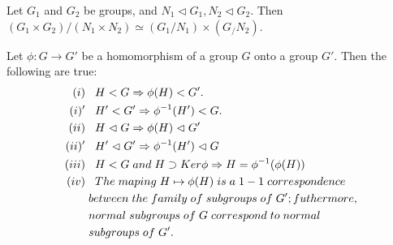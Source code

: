 \begin{teo}
    Let $G_1$ and $G_2$ be groups, and $N_1\vartriangleleft G_1, N_2\vartriangleleft G_2$. Then $(G_1\times G_2)/(N_1\times N_2)\simeq (G_1/N_1)\times(G_/N_2)$.
\end{teo}
\begin{teo}
    Let $\phi:G\rightarrow G'$ be a homomorphism of a group $G$ onto a group $G'$. Then the following are true:
    \begin{align*}
    (i)&\hspace{.3cm}H<G\Rightarrow \phi(H)<G'.\\
    (i)'&\hspace{.3cm}H'<G'\Rightarrow \phi^{-1}(H')<G.\\
    (ii)&\hspace{.3cm}H\vartriangleleft G\Rightarrow \phi(H)\vartriangleleft G'\\
    (ii)'&\hspace{.3cm}H'\vartriangleleft G'\Rightarrow \phi^{-1}(H')\vartriangleleft G\\
    (iii)&\hspace{.3cm}H<G\hspace{.1cm}and\hspace{.1cm}H\supset Ker\phi \Rightarrow H=\phi^{-1}(\phi(H))\\
    (iv)&\hspace{.3cm}The\hspace{.1cm}maping\hspace{.1cm}H\mapsto\phi(H)\hspace{.1cm}is\hspace{.1cm}a\hspace{.1cm}1-1\hspace{.1cm}correspondence\\
    &\hspace{.1cm}between\hspace{.1cm}the\hspace{.1cm}family\hspace{.1cm}of\hspace{.1cm}subgroups\hspace{.1cm}of\hspace{.1cm}G';futhermore,\\
    &\hspace{.1cm}normal\hspace{.1cm}subgroups\hspace{.1cm}of\hspace{.1cm}G\hspace{.1cm}correspond\hspace{.1cm}to\hspace{.1cm}normal\\
    &\hspace{.1cm}subgroups\hspace{.1cm}of\hspace{.1cm}G'.
    \end{align*}
\end{teo}

